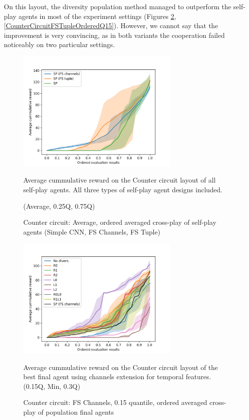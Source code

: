 On this layout, the diversity population method managed to outperform the self-play agents in most of the experiment settings (Figures \ref {CounterCircuitFSChannelsOrderedQ15}, \ref {CounterCircuitFSTupleOrderedQ15}).
However, we cannot say that the improvement is very convincing, as in both variants the cooperation failed noticeably on two particular settings. 


\begin{figure}[!ht]
    \centering
    \includegraphics*[width=8cm]{../img/CounterCircuitFSVariantsOrderedAvg.png}

    \caption{Counter circuit: Average, ordered averaged cross-play of self-play agents (Simple CNN, FS Channels, FS Tuple)}
    \label{CounterCircuitFSVariantsOrderedAvg}
    \medskip
    \small 
    Average cummulative reward on the Counter circuit layout of all self-play agents.
    All three types of self-play agent designs included.

    (Average, 0.25Q, 0.75Q)

\end{figure}


\begin{figure}[!ht]
    \centering
    \includegraphics*[width=8cm]{../img/CounterCircuitFSChannelsOrderedQ15.png}

    \caption{Counter circuit: FS Channels, 0.15 quantile, ordered averaged cross-play of population final agents}
    \label{CounterCircuitFSChannelsOrderedQ15}
    \medskip
    \small 
    Average cummulative reward on the Counter circuit layout of the best final agent using channels extension for temporal features.    
    (0.15Q, Min, 0.3Q)

\end{figure}


